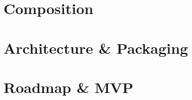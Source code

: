 \documentclass{MastersThesis}
\begin{document}
\part{Composition}
\label{part:composition}




\part{Architecture \& Packaging}
\label{part:architecture}






\part{Roadmap \& MVP}
\label{part:roadmap}








\end{document}

